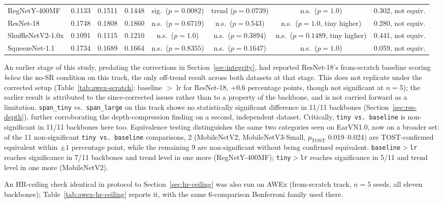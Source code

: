 \documentclass[11pt]{article}
\begin{document}
\begin{table}[H]
{\begin{tabular}{lccccccc}
RegNetY-400MF       & 0.1133 & 0.1511 & 0.1448 & sig.\ ($p{=}0.0082$) & trend ($p{=}0.0739$) & n.s.\ ($p{=}1.0$) & 0.302, not equiv. \\
ResNet-18           & 0.1748 & 0.1808 & 0.1860 & n.s.\ ($p{=}0.6719$) & n.s.\ ($p{=}0.543$)  & n.s.\ ($p{=}1.0$, tiny higher) & 0.280, not equiv. \\
ShuffleNetV2-1.0x   & 0.1091 & 0.1115 & 0.1210 & n.s.\ ($p{=}1.0$) & n.s.\ ($p{=}0.3894$) & n.s.\ ($p{=}0.1489$, tiny higher) & 0.441, not equiv. \\
SqueezeNet-1.1      & 0.1734 & 0.1689 & 0.1664 & n.s.\ ($p{=}0.8355$) & n.s.\ ($p{=}0.1647$) & n.s.\ ($p{=}1.0$) & 0.059, not equiv. \\
\bottomrule
\end{tabular}%
}
\end{table}

An earlier stage of this study, predating the corrections in Section~\ref{sec:integrity}, had reported ResNet-18's from-scratch baseline scoring \emph{below} the no-SR condition on this track, the only off-trend result across both datasets at that stage. This does not replicate under the corrected setup (Table~\ref{tab:awex-scratch}: baseline $>$ lr for ResNet-18, $+0.6$ percentage points, though not significant at $n=5$); the earlier result is attributed to the since-corrected issues rather than to a property of the backbone, and is not carried forward as a limitation. \texttt{span\_tiny} vs.\ \texttt{span\_large} on this track shows no statistically significant difference in 11/11 backbones (Section~\ref{sec:res-depth}), further corroborating the depth-compression finding on a second, independent dataset. Critically, \texttt{tiny vs.\ baseline} is non-significant in 11/11 backbones here too. Equivalence testing distinguishes the same two categories seen on EarVN1.0, now on a broader set: of the 11 non-significant \texttt{tiny vs.\ baseline} comparisons, 2 (MobileNetV2, MobileNetV3-Small, $p_{\text{TOST}}$ 0.019--0.024) are TOST-confirmed equivalent within $\pm 1$ percentage point, while the remaining 9 are non-significant without being confirmed equivalent. \texttt{baseline}$>$\texttt{lr} reaches significance in 7/11 backbones and trend level in one more (RegNetY-400MF); \texttt{tiny}$>$\texttt{lr} reaches significance in 5/11 and trend level in one more (MobileNetV2).

An HR-ceiling check identical in protocol to Section~\ref{sec:hr-ceiling} was also run on AWEx (from-scratch track, $n=5$ seeds, all eleven backbones); Table~\ref{tab:awex-hr-ceiling} reports it, with the same 6-comparison Bonferroni family used there.
\end{document}
